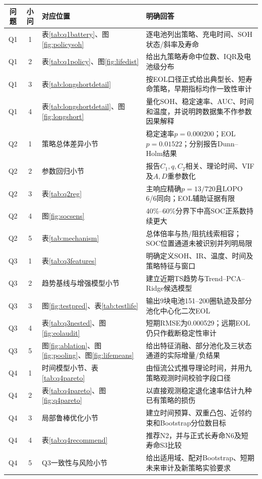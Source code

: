 \documentclass[withoutpreface]{cumcmthesis}
\begin{document}
\begin{table}[H]
\centering
\footnotesize
{}
\begin{tabularx}{\textwidth}{cclX}
\toprule
\rowcolor{TableHeader}
问题 & 小问 & 对应位置 & 明确回答 \\
\midrule
Q1 & 1 & 表\ref{tab:q1battery}、图\ref{fig:policysoh} & 逐电池列出策略、充电时间、SOH状态/斜率及寿命 \\
Q1 & 2 & 表\ref{tab:q1policy}、图\ref{fig:lifedist} & 给出九策略寿命中位数、IQR及电池级分布 \\
Q1 & 3 & 表\ref{tab:longshortdetail} & 按EOL口径正式给出典型长、短寿命策略，早期指标均作一致性审计 \\
Q1 & 4 & 表\ref{tab:longshortdetail}、图\ref{fig:longshort} & 量化SOH、稳定速率、AUC、时间和温度，并说明跨数据集不作参数因果解释 \\
\midrule
Q2 & 1 & 策略总体差异小节 & 稳定速率$p=0.000200$；EOL $p=0.01522$；分别报告Dunn--Holm结果 \\
Q2 & 2 & 参数回归小节 & 报告$C_1,q,C_2$相关、理论时间、VIF及$A,D$重参数化 \\
Q2 & 3 & 表\ref{tab:q2reg} & 主响应精确$p=13/720$且LOPO 6/6同向；EOL辅助证据有限 \\
Q2 & 4 & 图\ref{fig:socsens} & 40\%--60\%分界下中高SOC正系数持续更大 \\
Q2 & 5 & 表\ref{tab:mechanism} & 总体倍率与热/阻抗线索相容；SOC位置通道未被识别并列明局限 \\
\midrule
Q3 & 1 & 表\ref{tab:q3features} & 明确定义SOH、IR、温度、时间及策略特征与窗口 \\
Q3 & 2 & 趋势基线与增强模型小节 & 建立近期TS趋势与Trend--PCA--Ridge候选模型 \\
Q3 & 3 & 图\ref{fig:testpred}、表\ref{tab:testlife} & 输出9块电池151--200圈轨迹及部分池化中心化二次EOL \\
Q3 & 4 & 表\ref{tab:q3nested}、图\ref{fig:eolaudit} & 短期RMSE为0.000529；远期EOL仍只作截断稳定性审计 \\
Q3 & 5 & 图\ref{fig:ablation}、图\ref{fig:pooling}、图\ref{fig:lifemeans} & 给出特征消融、部分池化及三状态通道的实际增量/负结果 \\
\midrule
Q4 & 1 & 时间模型小节、表\ref{tab:q4pareto} & 由恒流公式推导理论时间，并用九策略观测时间校验字段口径 \\
Q4 & 2 & 表\ref{tab:q4pareto}、图\ref{fig:q4pareto} & 以直接观测稳定退化速率估计九种已有策略的损伤 \\
Q4 & 3 & 局部鲁棒优化小节 & 建立时间预算、双重凸包、近邻约束和Bootstrap分位数目标 \\
Q4 & 4 & 表\ref{tab:q4recommend} & 推荐N2，并与正式长寿命N6及短寿命S3比较 \\
Q4 & 5 & Q3一致性与风险小节 & 给出适用域、配对Bootstrap、短期未来审计及新策略实验要求 \\
\bottomrule
\end{tabularx}
\label{tab:coverage}
\end{table}
\end{document}
